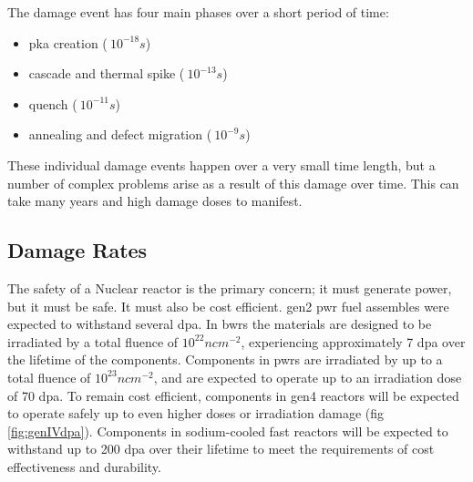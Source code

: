 The damage event has four main phases over a short period of time\cite{gswasdamage}:

\begin{itemize}
\item \acrshort{pka} creation ($~ 10^{-18}s$)
\item cascade and thermal spike ($~ 10^{-13}s$)
\item quench ($~ 10^{-11}s$)
\item annealing and defect migration ($~ 10^{-9}s$)
\end{itemize}

These individual damage events happen over a very small time length, but a number of complex problems arise as a result of this damage over time.  This can take many years and high damage doses to manifest.


\subsection{Damage Rates}
\FloatBarrier

The safety of a Nuclear reactor is the primary concern; it must generate power, but it must be safe.  It must also be cost efficient.  \acrshort{gen2} \acrshort{pwr} fuel assembles were expected to withstand several \acrshort{dpa}\cite{genIVstrucmat}.  In \acrshort{bwr}s the materials are designed to be irradiated by a total fluence of $10^{22} n cm^{-2}$, experiencing approximately 7 \acrshort{dpa} over the lifetime of the components\cite{lightwaterallenbusby}.  Components in \acrshort{pwr}s are irradiated by up to a total fluence of $10^{23} n cm^{-2}$, and are expected to operate up to an irradiation dose of 70 \acrshort{dpa}\cite{lightwaterallenbusby}.  To remain cost efficient, components in \acrshort{gen4} reactors will be expected to operate safely up to even higher doses or irradiation damage (fig \ref{fig:genIVdpa}).  Components in sodium-cooled fast reactors will be expected to withstand up to 200 \acrshort{dpa} over their lifetime to meet the requirements of cost effectiveness and durability\cite{genIVstrucmat}.


